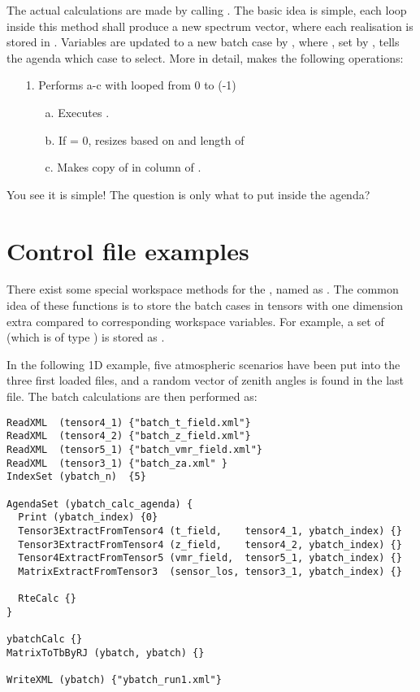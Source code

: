 The actual calculations are made by calling . The
basic idea is simple, each loop inside this method shall produce a new
spectrum vector, where each realisation is stored in
. Variables are updated to a new batch case by
, where , set
by , tells the agenda which case to select.
More in detail,  makes the following operations:

\begin{itemize}

\item[1.] Performs a-c with  looped from 0
to (-1)

\begin{itemize}
\item[a.] Executes .
\item[b.] If  = 0, resizes
 based
on  and length of  
\item[c.] Makes copy of  in column  of .
\end{itemize}

\end{itemize}

You see it is simple! The question is only what to put inside the
agenda?


\section{Control file examples}
%
There exist some special workspace methods for the
, named as
.  The common idea of these functions is to
store the batch cases in tensors with one dimension extra compared to
corresponding workspace variables. For example, a set of
 (which is of type ) is stored
as .

In the following 1D example, five atmospheric scenarios
have been put into the three first loaded files, and a random vector
of zenith angles is found in the last file. The batch calculations
are then performed as:

\begin{verbatim}
ReadXML  (tensor4_1) {"batch_t_field.xml"}
ReadXML  (tensor4_2) {"batch_z_field.xml"}
ReadXML  (tensor5_1) {"batch_vmr_field.xml"}
ReadXML  (tensor3_1) {"batch_za.xml" }
IndexSet (ybatch_n)  {5}

AgendaSet (ybatch_calc_agenda) {
  Print (ybatch_index) {0}
  Tensor3ExtractFromTensor4 (t_field,    tensor4_1, ybatch_index) {}
  Tensor3ExtractFromTensor4 (z_field,    tensor4_2, ybatch_index) {}
  Tensor4ExtractFromTensor5 (vmr_field,  tensor5_1, ybatch_index) {}
  MatrixExtractFromTensor3  (sensor_los, tensor3_1, ybatch_index) {}

  RteCalc {}
}

ybatchCalc {}
MatrixToTbByRJ (ybatch, ybatch) {}

WriteXML (ybatch) {"ybatch_run1.xml"}
\end{verbatim}

